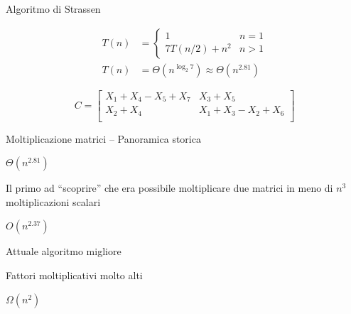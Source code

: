 \begin{frame}{Algoritmo di Strassen}
\small
\vspace{-12pt}
{

\vspace{-12pt}
\begin{align*}
T(n) &= \left\{ 
  \begin{array}{ll}
     1 & n = 1\\
     7T(n/2) + n^2  & n > 1 
  \end{array} 
\right.\\
T(n) &= \Theta(n^{\log_2 7}) \approx \Theta(n^{2.81})
\end{align*}
}
\bigskip
{}

\[
C = 
\begin{bmatrix} 
 X_{1} + X_{4} - X_{5} + X_{7} & X_{3} + X_{5} \\
X_{2} + X_{4} & X_{1} + X_{3} - X_{2} + X_{6} \\
\end{bmatrix}
\]
\end{frame}

\begin{frame}{Moltiplicazione matrici -- Panoramica storica}

\BI
\item $\Theta(n^{2.81})$
\item Il primo ad “scoprire” che era possibile moltiplicare due matrici in meno di $n^3$ 
moltiplicazioni scalari
\EI

\medskip
{}
\BI
\item $O(n^{2.37})$
\item Attuale algoritmo migliore
\item Fattori moltiplicativi molto alti
\EI

\medskip
{}
\BI
\item $\Omega(n^2)$
\EI
\end{frame}

